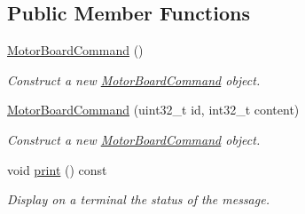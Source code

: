 \subsection*{Public Member Functions}
\begin{DoxyCompactItemize}
\item 
\mbox{\label{classblmc__drivers_1_1MotorBoardCommand_ad5ac32071cbf2854135fee7bb89acf4e}} 
\hyperlink{classblmc__drivers_1_1MotorBoardCommand_ad5ac32071cbf2854135fee7bb89acf4e}{Motor\+Board\+Command} ()
\begin{DoxyCompactList}\small\item\em Construct a new \hyperlink{classblmc__drivers_1_1MotorBoardCommand}{Motor\+Board\+Command} object. \end{DoxyCompactList}\item 
\hyperlink{classblmc__drivers_1_1MotorBoardCommand_ae7cf695d2600d84929729befc3cb29f9}{Motor\+Board\+Command} (uint32\+\_\+t id, int32\+\_\+t content)
\begin{DoxyCompactList}\small\item\em Construct a new \hyperlink{classblmc__drivers_1_1MotorBoardCommand}{Motor\+Board\+Command} object. \end{DoxyCompactList}\item 
\mbox{\label{classblmc__drivers_1_1MotorBoardCommand_a1e594584bb059b92e416c7738551ccaa}} 
void \hyperlink{classblmc__drivers_1_1MotorBoardCommand_a1e594584bb059b92e416c7738551ccaa}{print} () const
\begin{DoxyCompactList}\small\item\em Display on a terminal the status of the message. \end{DoxyCompactList}\end{DoxyCompactItemize}
